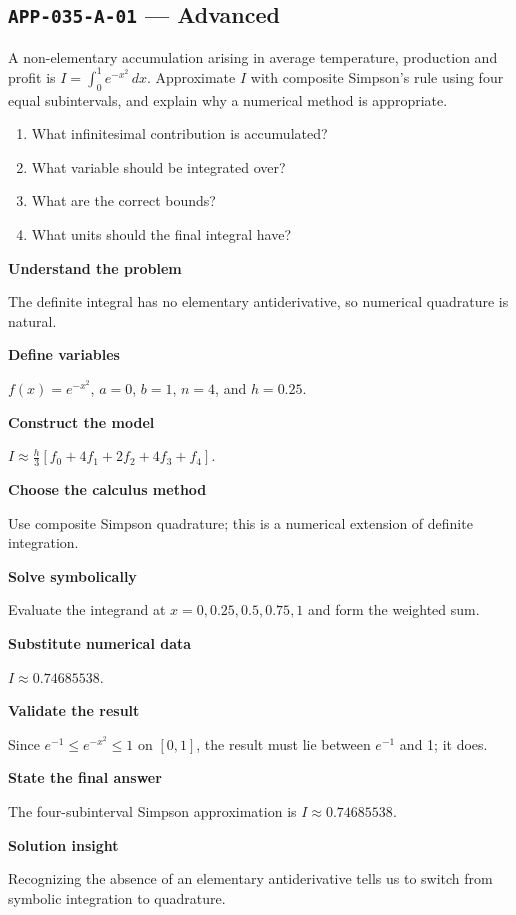 \documentclass[11pt]{book}
\newcommand{\pid}[1]{\texttt{#1}}
\begin{document}
\subsection*{\pid{APP-035-A-01} — Advanced}
\begin{problembox}
A non-elementary accumulation arising in average temperature, production and profit is $I=\int_0^1 e^{-x^2}\,dx$. Approximate $I$ with composite Simpson's rule using four equal subintervals, and explain why a numerical method is appropriate.
\end{problembox}
\begin{promptbox}\begin{enumerate}
\item What infinitesimal contribution is accumulated?
\item What variable should be integrated over?
\item What are the correct bounds?
\item What units should the final integral have?
\end{enumerate}\end{promptbox}
\begin{solutionbox}
\textbf{Understand the problem}\par The definite integral has no elementary antiderivative, so numerical quadrature is natural.\par\medskip
\textbf{Define variables}\par $f(x)=e^{-x^2}$, $a=0$, $b=1$, $n=4$, and $h=0.25$.\par\medskip
\textbf{Construct the model}\par $I\approx\frac{h}{3}[f_0+4f_1+2f_2+4f_3+f_4]$.\par\medskip
\textbf{Choose the calculus method}\par Use composite Simpson quadrature; this is a numerical extension of definite integration.\par\medskip
\textbf{Solve symbolically}\par Evaluate the integrand at $x=0,0.25,0.5,0.75,1$ and form the weighted sum.\par\medskip
\textbf{Substitute numerical data}\par $I\approx 0.74685538$.\par\medskip
\textbf{Validate the result}\par Since $e^{-1}\le e^{-x^2}\le1$ on $[0,1]$, the result must lie between $e^{-1}$ and 1; it does.\par\medskip
\textbf{State the final answer}\par The four-subinterval Simpson approximation is $I\approx 0.74685538$.\par\medskip
\textbf{Solution insight}\par Recognizing the absence of an elementary antiderivative tells us to switch from symbolic integration to quadrature.\par\medskip
\end{solutionbox}
\end{document}
